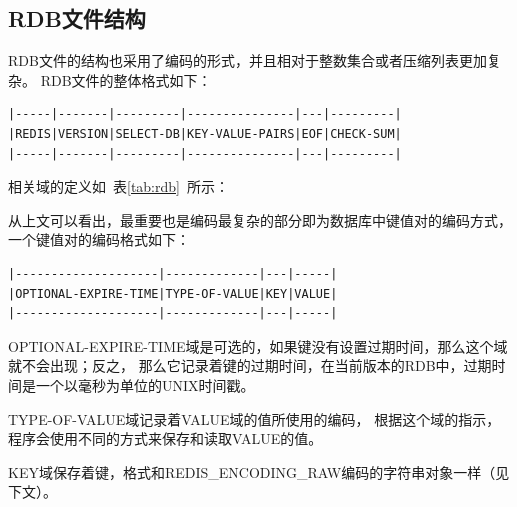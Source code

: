 \documentclass{zjutthesis}
\begin{document}
\subsection{RDB文件结构}
RDB文件的结构也采用了编码的形式，并且相对于整数集合或者压缩列表更加复杂。
RDB文件的整体格式如下：
\begin{verbatim}
|-----|-------|---------|---------------|---|---------|
|REDIS|VERSION|SELECT-DB|KEY-VALUE-PAIRS|EOF|CHECK-SUM|
|-----|-------|---------|---------------|---|---------|
\end{verbatim}
相关域的定义如~表\ref{tab:rdb}~所示：
\begin{table}[htbp]
\caption{RDB文件结构}\label{tab:rdb}
\vspace{\baselineskip}
\end{table}

从上文可以看出，最重要也是编码最复杂的部分即为数据库中键值对的编码方式，一个键值对的编码格式如下：
\begin{verbatim}
|--------------------|-------------|---|-----|
|OPTIONAL-EXPIRE-TIME|TYPE-OF-VALUE|KEY|VALUE|
|--------------------|-------------|---|-----|
\end{verbatim}
OPTIONAL-EXPIRE-TIME域是可选的，如果键没有设置过期时间，那么这个域就不会出现；反之，
那么它记录着键的过期时间，在当前版本的RDB中，过期时间是一个以毫秒为单位的UNIX时间戳。

TYPE-OF-VALUE域记录着VALUE域的值所使用的编码，
根据这个域的指示，程序会使用不同的方式来保存和读取VALUE的值。

KEY域保存着键，格式和REDIS\_ENCODING\_RAW编码的字符串对象一样（见下文）。
\end{document}
